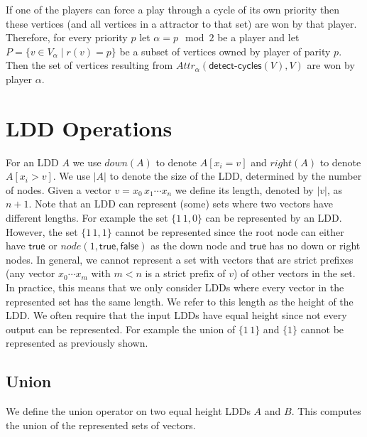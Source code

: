 \documentclass{article}
\newcommand{\var}[1]{\ensuremath{\textit{#1}}}
\newcommand{\attrsym}{\ensuremath{\textit{Attr}}}
\newcommand{\attr}[3][]{\ensuremath{\attrsym^{#1}_{#2}(#3)}}
\begin{document}
If one of the players can force a play through a cycle of its own priority then these vertices (and all vertices in a attractor to that set) are won by that player.
Therefore, for every priority $p$ let $\alpha = p \mod 2$ be a player and let $P = \{v \in V_\alpha \mid r(v) = p\}$ be a subset of vertices owned by player of parity $p$.
Then the set of vertices resulting from $\attr{\alpha}{\textsf{detect-cycles}(V), V}$ are won by player $\alpha$.

\newpage
\section{LDD Operations}

\newcommand{\lddnode}{\textsf{node}}
\newcommand{\lddright}{\textit{right}}
\newcommand{\ldddown}{\textit{down}}
\newcommand{\lddval}{\textit{val}}
\newcommand{\lddtrue}{\textsf{true}}
\newcommand{\lddfalse}{\textsf{false}}

For an LDD $A$ we use $\ldddown(A)$ to denote $A[x_i = v]$ and $\lddright(A)$ to denote $A[x_i > v]$.
We use $|A|$ to denote the size of the LDD, determined by the number of nodes.
Given a vector $v = x_0\,x_1 \cdots x_n$ we define its length, denoted by $|v|$, as $n + 1$.
Note that an LDD can represent (some) sets where two vectors have different lengths.
For example the set $\{1\,1, 0\}$ can be represented by an LDD.
However, the set $\{1\,1, 1\}$ cannot be represented since the root node can either have $\textsf{true}$ or $\var{node}(1, \textsf{true}, \textsf{false})$ as the down node and $\textsf{true}$ has no down or right nodes.
In general, we cannot represent a set with vectors that are strict prefixes (any vector $x_0 \cdots x_m$ with $m < n$ is a strict prefix of $v$) of other vectors in the set.
In practice, this means that we only consider LDDs where every vector in the represented set has the same length.
We refer to this length as the height of the LDD.
We often require that the input LDDs have equal height since not every output can be represented.
For example the union of $\{1\,1\}$ and $\{1\}$ cannot be represented as previously shown.

\subsection{Union}

We define the union operator on two equal height LDDs $A$ and $B$.
This computes the union of the represented sets of vectors.
\end{document}
